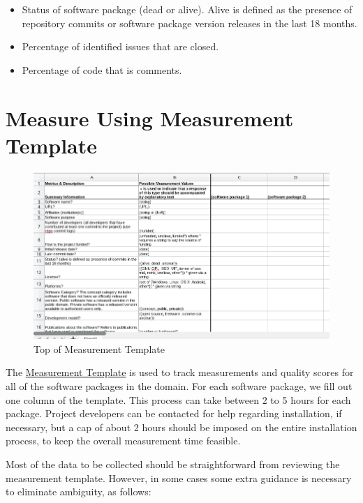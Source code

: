 \documentclass[letterpaper,cleveref]{lipics-v2019}
\theoremstyle{definition}
\begin{document}
\begin{itemize}
\item Status of software package (dead or alive). Alive is defined as the
  presence of repository commits or software package version releases in the
  last 18 months.
\item Percentage of identified issues that are closed.
\item Percentage of code that is comments.
\end{itemize}

\section{Measure Using Measurement Template} \label{SecShallowMeasure}

\begin{figure}[h!]
  \begin{center}
    \includegraphics[width=1.0\textwidth]{measurement_template}
    \caption{Top of Measurement Template}
    \label{measurement_template_image}
  \end{center}
\end{figure}

The
\href{https://github.com/smiths/AIMSS/blob/master/StateOfPractice/Methodology/Combined_MeasurementTemplate_EmpiricalMeasures.xlsx}
{Measurement Template} is used to track measurements and quality scores for all
of the software packages in the domain. For each software package, we fill out one
column of the template. This process can take between 2 to 5 hours for each
package.  Project developers can be contacted for help regarding installation,
if necessary, but a cap of about 2 hours should be imposed on the entire
installation process, to keep the overall measurement time feasible.

Most of the data to be collected should be straightforward from reviewing the
measurement template.  However, in some cases some extra guidance is necessary
to eliminate ambiguity, as follows:
\end{document}
